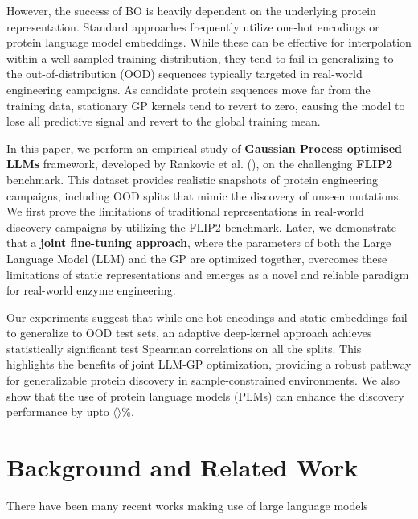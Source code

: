 \documentclass{article}
\theoremstyle{plain}
\theoremstyle{definition}
\theoremstyle{remark}
\begin{document}
However, the success of BO is heavily dependent on the underlying protein representation. Standard approaches frequently utilize one-hot encodings or protein language model embeddings. While these can be effective for interpolation within a well-sampled training distribution, they tend to fail in generalizing to the out-of-distribution (OOD) sequences typically targeted in real-world engineering campaigns. As candidate protein sequences move far from the training data, stationary GP kernels tend to revert to zero, causing the model to lose all predictive signal and revert to the global training mean.

In this paper, we perform an empirical study of \textbf{Gaussian Process optimised LLMs} framework, developed by Rankovic et al. (\citeyear{rankovic2025gollum}), on the challenging \textbf{FLIP2} benchmark. This dataset provides realistic snapshots of protein engineering campaigns, including OOD splits that mimic the discovery of unseen mutations. We first prove the limitations of traditional representations in real-world discovery campaigns by utilizing the FLIP2 benchmark. Later, we demonstrate that a \textbf{joint fine-tuning approach}, where the parameters of both the Large Language Model (LLM) and the GP are optimized together, overcomes these limitations of static representations and emerges as a novel and reliable paradigm for real-world enzyme engineering. 

Our experiments suggest that while one-hot encodings and static embeddings fail to generalize to OOD test sets, an adaptive deep-kernel approach achieves statistically significant test Spearman correlations on all the splits. This highlights the benefits of joint LLM-GP optimization, providing a robust pathway for generalizable protein discovery in sample-constrained environments. We also show that the use of protein language models (PLMs) can enhance the discovery performance by upto $\langle\rangle$\%. 

\section{Background and Related Work}
There have been many recent works making use of large language models 
\end{document}

